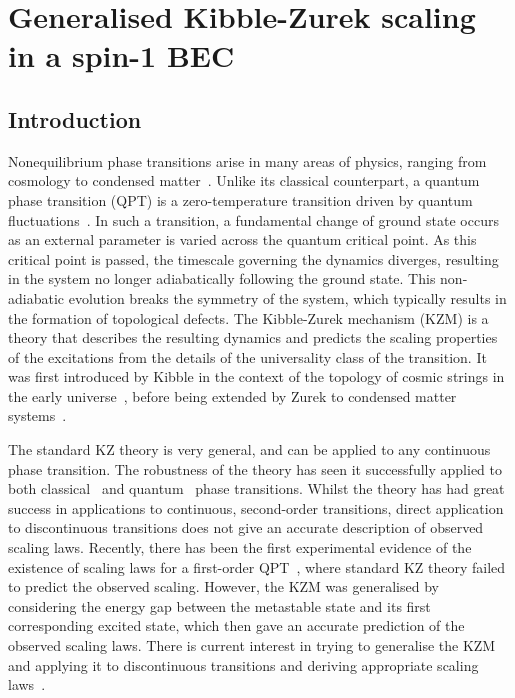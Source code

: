 \chapter{Generalised Kibble-Zurek scaling in a spin-1 BEC}\label{chap: spin-1}


\section{Introduction}
Nonequilibrium phase transitions arise in many areas of physics, ranging from
cosmology to condensed matter~\cite{Polkovnikov2011}.
Unlike its classical counterpart, a quantum phase transition (QPT) is a
zero-temperature transition driven by quantum fluctuations~\cite{Sachdev2011}.
In such a transition, a fundamental change of ground state occurs as an external
parameter is varied across the quantum critical point.
As this critical point is passed, the timescale governing the dynamics diverges,
resulting in the system no longer adiabatically following the ground state.
This non-adiabatic evolution breaks the symmetry of the system, which typically
results in the formation of topological defects.
The Kibble-Zurek mechanism (KZM) is a theory that describes the resulting
dynamics and predicts the scaling properties of the excitations from the details
of the universality class of the transition.
It was first introduced by Kibble in the context of the topology of cosmic
strings in the early universe~\cite{Kibble1976, Kibble1980}, before being
extended by Zurek to condensed matter systems~\cite{Zurek1985, Zurek1993,
    Zurek1996}.


The standard KZ theory is very general, and can be applied to any continuous
phase transition.
The robustness of the theory has seen it successfully applied to both
classical~\cite{Donadello2016,Beugnon2017} and
quantum~\cite{Dziarmaga2005, Damski2005, Lamacraft2007} phase transitions.
Whilst the theory has had great success in applications to continuous,
second-order transitions, direct application to discontinuous transitions
does not give an accurate description of observed scaling laws.
Recently, there has been the first experimental evidence of the existence of
scaling laws for a first-order QPT~\cite{Qiu2020}, where standard KZ theory
failed to predict the observed scaling.
However, the KZM was generalised by considering the energy gap between the
metastable state and its first corresponding excited state, which then gave an
accurate prediction of the observed scaling laws.
There is current interest in trying to generalise the KZM and applying it to
discontinuous transitions and deriving appropriate scaling
laws~\cite{Divakaran2008, Suzuki2015}.

